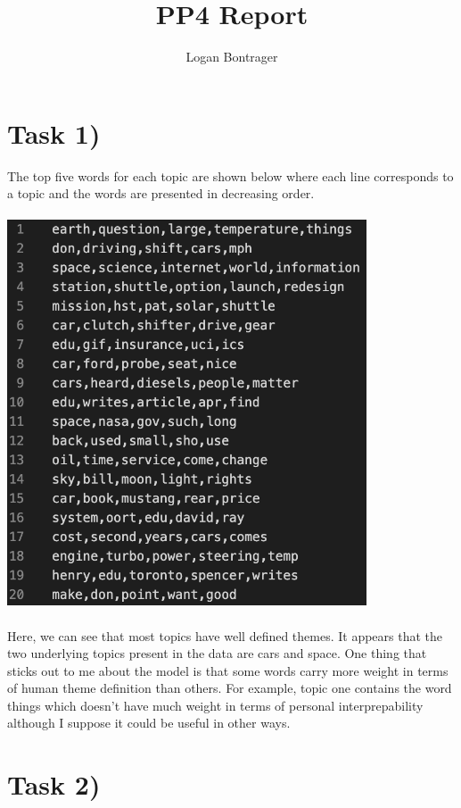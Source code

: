 \documentclass{article}
\begin{document}
\title{PP4 Report}
\author{Logan Bontrager}
\maketitle

\section*{Task 1)}

The top five words for each topic are shown below where each line corresponds to a topic and the words are presented in decreasing order.
\\ \\
\includegraphics[width=0.8\textwidth]{../output/topics.png}
\\ \\
Here, we can see that most topics have well defined themes. It appears that the two underlying topics present in the data are cars and space. One thing that sticks out to me about the model is that some words carry more weight in terms of human theme definition than others. For example, topic one contains the word things which doesn't have much weight in terms of personal interprepability although I suppose it could be useful in other ways.

\section*{Task 2)}
\end{document}
